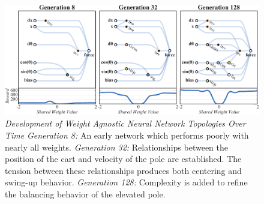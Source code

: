 



\begin{figure}[!htb]        
\vskip -0.00in %
    \centering        
    \includegraphics[width=1\textwidth]{img/swing.pdf}   
\vskip -0.05in %
    \caption      
    {     
        \textit{Development of Weight Agnostic Neural Network Topologies Over Time}
        \newline
        \textit{Generation 8:} An early network which performs poorly with nearly all weights.
        \newline
        \textit{Generation 32:} Relationships between the position of the cart and velocity of the pole are established. The tension between these relationships produces both centering and swing-up behavior.
        \newline
        \textit{Generation 128:} Complexity is added to refine the balancing behavior of the elevated pole.
    }         
    \label{fig:swingNets}      
\vskip -0.05in %
\end{figure}
